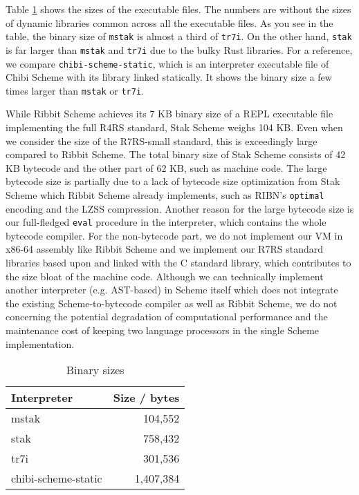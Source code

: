 \documentclass[sigplan, anonymous, review]{acmart}
\begin{document}
Table \ref{table:binary} shows the sizes of the executable files.
The numbers are without the sizes of dynamic libraries common across
all the executable files.
As you see in the table, the binary size of \texttt{mstak} is almost
a third of \texttt{tr7i}.
On the other hand, \texttt{stak} is far larger than \texttt{mstak} and
\texttt{tr7i} due to the bulky Rust libraries.
For a reference, we compare \texttt{chibi-scheme-static}, which is an
interpreter executable file of Chibi Scheme with its library linked statically.
It shows the binary size a few times larger than \texttt{mstak} or
\texttt{tr7i}.

While Ribbit Scheme \cite{ribbit7kb2023} achieves its 7 KB binary size
of a REPL executable file implementing the full R4RS standard, Stak
Scheme weighs 104 KB.
Even when we consider the size of the R7RS-small standard, this is
exceedingly large compared to Ribbit Scheme.
The total binary size of Stak Scheme consists of 42 KB bytecode and
the other part of 62 KB, such as machine code.
The large bytecode size is partially due to a lack of
bytecode size optimization from Stak Scheme which Ribbit Scheme already
implements, such as RIBN's \texttt{optimal} encoding and the
LZSS compression.
Another reason for the large bytecode size is our full-fledged
\texttt{eval} procedure in the interpreter, which contains the
whole bytecode compiler.
For the non-bytecode part, we do not implement our VM in x86-64
assembly like Ribbit Scheme and we implement our R7RS standard libraries
based upon and linked with the C standard library,
which contributes to the size bloat of the machine code.
Although we can technically implement another interpreter
(e.g. AST-based) in Scheme itself which does not integrate the
existing Scheme-to-bytecode compiler as well as Ribbit Scheme,
we do not concerning the potential degradation of
computational performance and the maintenance cost of keeping two
language processors in the single Scheme implementation.

\begin{table}
  \begin{center}
    \caption{Binary sizes}
    \label{table:binary}
    \begin{tabular}{l|r}
      \hline
      Interpreter & Size / bytes \\
      \hline
      mstak & 104,552 \\
      stak & 758,432 \\
      tr7i & 301,536 \\
      chibi-scheme-static & 1,407,384 \\
      \hline
    \end{tabular}
  \end{center}
\end{table}
\end{document}
